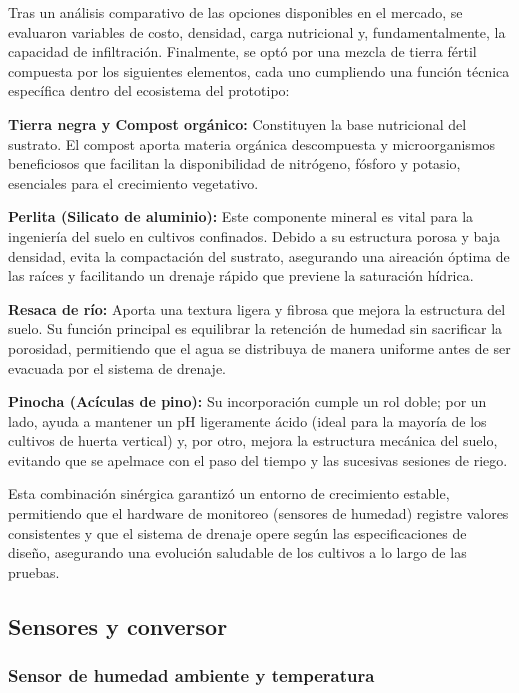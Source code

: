 Tras un análisis comparativo de las opciones disponibles en el mercado, se evaluaron variables de costo, densidad, carga nutricional y, fundamentalmente, la capacidad de infiltración. Finalmente, se optó por una mezcla de tierra fértil compuesta por los siguientes elementos, cada uno cumpliendo una función técnica específica dentro del ecosistema del prototipo:

\textbf{Tierra negra y Compost orgánico:} Constituyen la base nutricional del sustrato. El compost aporta materia orgánica descompuesta y microorganismos beneficiosos que facilitan la disponibilidad de nitrógeno, fósforo y potasio, esenciales para el crecimiento vegetativo.

\textbf{Perlita (Silicato de aluminio):} Este componente mineral es vital para la ingeniería del suelo en cultivos confinados. Debido a su estructura porosa y baja densidad, evita la compactación del sustrato, asegurando una aireación óptima de las raíces y facilitando un drenaje rápido que previene la saturación hídrica.

\textbf{Resaca de río:} Aporta una textura ligera y fibrosa que mejora la estructura del suelo. Su función principal es equilibrar la retención de humedad sin sacrificar la porosidad, permitiendo que el agua se distribuya de manera uniforme antes de ser evacuada por el sistema de drenaje.

\textbf{Pinocha (Acículas de pino):} Su incorporación cumple un rol doble; por un lado, ayuda a mantener un pH ligeramente ácido (ideal para la mayoría de los cultivos de huerta vertical) y, por otro, mejora la estructura mecánica del suelo, evitando que se apelmace con el paso del tiempo y las sucesivas sesiones de riego.

Esta combinación sinérgica garantizó un entorno de crecimiento estable, permitiendo que el hardware de monitoreo (sensores de humedad) registre valores consistentes y que el sistema de drenaje opere según las especificaciones de diseño, asegurando una evolución saludable de los cultivos a lo largo de las pruebas.

\subsection{Sensores y conversor}
\label{subsec:sensores_conversor}

\subsubsection{Sensor de humedad ambiente y temperatura}

